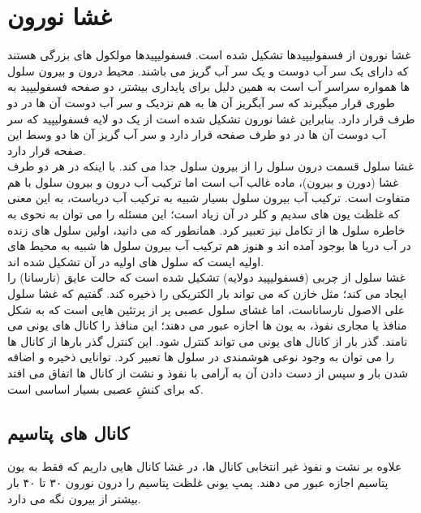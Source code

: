 \documentclass[a4paper,12pt]{article}
\begin{document}
\section{ غشا نورون}
غشا نورون از فسفولیپیدها تشکیل شده است. فسفولیپیدها مولکول های بزرگی هستند که دارای یک سر آب دوست و یک سر آب گریز می باشند. محیط درون و بیرون سلول ها همواره سراسر آب است به همین دلیل برای پایداری بیشتر، دو صفحه فسفولیپید به طوری قرار میگیرند که سر آبگریز آن ها به هم نزدیک و سر آب دوست آن ها در دو طرف قرار دارد. بنابراین غشا نورون تشکیل شده است از یک دو لایه فسفولیپید که سر آب دوست آن ها در دو طرف صفحه قرار دارد و سر آب گریز آن  ها دو وسط این صفحه قرار دارد.
\\
 غشا سلول قسمت درون سلول را از بیرون سلول جدا می کند. با اینکه در هر دو طرف غشا (دورن و بیرون)، ماده غالب آب است اما ترکیب آب درون و بیرون سلول با هم متفاوت است. ترکیب آب بیرون سلول بسیار شبیه به ترکیب آب دریاست، به این معنی که غلظت یون های سدیم و کلر در آن زیاد است؛ این مسئله را می توان به نحوی به خاطره سلول ها از تکامل نیز تعبیر کرد.  همانطور که می دانید، اولین سلول های زنده در آب دریا ها بوجود آمده اند و هنوز هم ترکیب آب بیرون سلول ها شبیه به محیط های اولیه ایست که سلول های اولیه در آن تشکیل شده اند. 
 \\
غشا سلول از چربی (فسفولیپید دولایه) تشکیل شده است که حالت عایق (نارسانا) را ایجاد می کند؛ مثل خازن که می تواند بار الکتریکی را ذخیره کند. گفتیم که غشا سلول علی الاصول نارساناست، اما غشای سلول عصبی پر از پرتئین هایی است که به شکل منافذ یا مجاری نفوذ، به یون ها اجازه عبور می دهند؛ این منافذ را کانال های یونی می نامند. گذر بار از کانال های یونی می تواند کنترل شود. این کنترل گذر بارها از کانال ها را می توان به وجود نوعی هوشمندی در سلول ها تعبیر کرد. 
توانایی ذخیره و اضافه شدن بار و سپس از دست دادن آن به آرامی با نفوذ و نشت از کانال ها اتفاق می افتد که برای کنشِ عصبی بسیار اساسی است. 
\subsection{کانال های پتاسیم}
علاوه بر نشت و نفوذ غیر انتخابی کانال ها، در غشا کانال هایی داریم که فقط به یون پتاسیم اجازه عبور می دهند. پمپ یونی غلظت پتاسیم را درون نورون ۳۰ تا ۴۰ بار بیشتر از بیرون نگه می دارد. 
\end{document}
